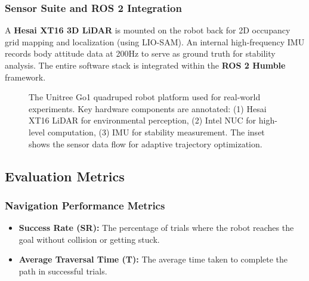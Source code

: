 \documentclass[lettersize,journal]{IEEEtran}
\begin{document}
\subsubsection{Sensor Suite and ROS 2 Integration}
A \textbf{Hesai XT16 3D LiDAR} is mounted on the robot back for 2D occupancy grid mapping and localization (using LIO-SAM). An internal high-frequency IMU records body attitude data at 200Hz to serve as ground truth for stability analysis. The entire software stack is integrated within the \textbf{ROS 2 Humble} framework.

\begin{figure}[!t]
\centering
\caption{The Unitree Go1 quadruped robot platform used for real-world experiments. Key hardware components are annotated: (1) Hesai XT16 LiDAR for environmental perception, (2) Intel NUC for high-level computation, (3) IMU for stability measurement. The inset shows the sensor data flow for adaptive trajectory optimization.}
\label{fig:robot_platform}
\end{figure}

\subsection{Evaluation Metrics}

\subsubsection{Navigation Performance Metrics}
\begin{itemize}
\item \textbf{Success Rate (SR):} The percentage of trials where the robot reaches the goal without collision or getting stuck.
\item \textbf{Average Traversal Time (T):} The average time taken to complete the path in successful trials.
\end{itemize}
\end{document}

